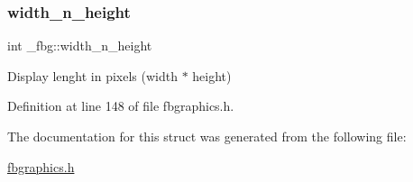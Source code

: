 \mbox{\label{struct__fbg_a1ab3f10e8c3483d7286db9850511d46d}} 
\subsubsection{\texorpdfstring{width\+\_\+n\+\_\+height}{width\_n\_height}}
{\footnotesize\ttfamily int \+\_\+fbg\+::width\+\_\+n\+\_\+height}



Display lenght in pixels (width $\ast$ height) 



Definition at line 148 of file fbgraphics.\+h.



The documentation for this struct was generated from the following file\+:\begin{DoxyCompactItemize}
\item 
\mbox{\hyperlink{fbgraphics_8h}{fbgraphics.\+h}}\end{DoxyCompactItemize}
